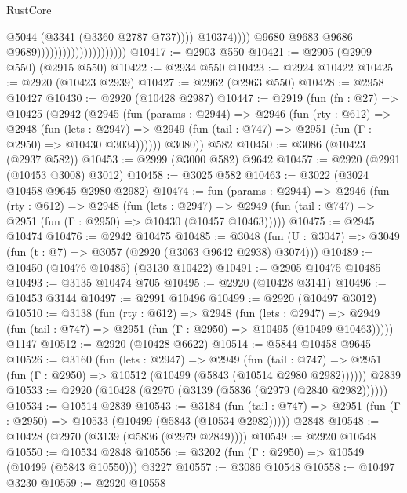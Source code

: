 \begin{lexlean}{RustCore}
\begin{coremodule}
                                                          @5044
                                                          (@3341 (@3360 @2787 @737))))
                                                      @10374))))
                                              @9680
                                              @9683
                                              @9686
                                              @9689)))))))))))))))))))))
@10417 := @2903 @550
@10421 := @2905 (@2909 @550) (@2915 @550)
@10422 := @2934 @550
@10423 := @2924 @10422
@10425 := @2920 (@10423 @2939)
@10427 := @2962 (@2963 @550)
@10428 := @2958 @10427
@10430 := @2920 (@10428 @2987)
@10447 := @2919
    (fun (fn : @27) =>
    @10425
      (@2942
        (@2945
          (fun (params : @2944) =>
          @2946
            (fun (rty : @612) =>
            @2948
              (fun (lets : @2947) =>
              @2949 (fun (tail : @747) => @2951 (fun (Γ : @2950) => @10430 @3034))))))
        @3080))
    @582
@10450 := @3086 (@10423 (@2937 @582))
@10453 := @2999 (@3000 @582) @9642
@10457 := @2920 (@2991 (@10453 @3008) @3012)
@10458 := @3025 @582
@10463 := @3022 (@3024 @10458 @9645 @2980 @2982)
@10474 := fun (params : @2944) =>
  @2946
    (fun (rty : @612) =>
    @2948
      (fun (lets : @2947) =>
      @2949 (fun (tail : @747) => @2951 (fun (Γ : @2950) => @10430 (@10457 @10463)))))
@10475 := @2945 @10474
@10476 := @2942 @10475
@10485 := @3048 (fun (U : @3047) => @3049 (fun (t : @7) => @3057 (@2920 (@3063 @9642 @2938) @3074)))
@10489 := @10450 (@10476 @10485) (@3130 @10422)
@10491 := @2905 @10475 @10485
@10493 := @3135 @10474 @705
@10495 := @2920 (@10428 @3141)
@10496 := @10453 @3144
@10497 := @2991 @10496
@10499 := @2920 (@10497 @3012)
@10510 := @3138
    (fun (rty : @612) =>
    @2948
      (fun (lets : @2947) =>
      @2949 (fun (tail : @747) => @2951 (fun (Γ : @2950) => @10495 (@10499 @10463)))))
    @1147
@10512 := @2920 (@10428 @6622)
@10514 := @5844 @10458 @9645
@10526 := @3160
    (fun (lets : @2947) =>
    @2949
      (fun (tail : @747) =>
      @2951 (fun (Γ : @2950) => @10512 (@10499 (@5843 (@10514 @2980 @2982))))))
    @2839
@10533 := @2920 (@10428 (@2970 (@3139 (@5836 (@2979 (@2840 @2982))))))
@10534 := @10514 @2839
@10543 := @3184
    (fun (tail : @747) => @2951 (fun (Γ : @2950) => @10533 (@10499 (@5843 (@10534 @2982)))))
    @2848
@10548 := @10428 (@2970 (@3139 (@5836 (@2979 @2849))))
@10549 := @2920 @10548
@10550 := @10534 @2848
@10556 := @3202 (fun (Γ : @2950) => @10549 (@10499 (@5843 @10550))) @3227
@10557 := @3086 @10548
@10558 := @10497 @3230
@10559 := @2920 @10558

\end{coremodule}
\end{lexlean}
